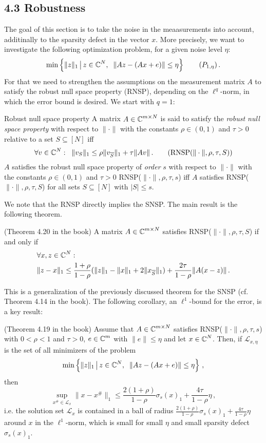 \documentclass[a4paper]{article}
\begin{document}
\subsection*{4.3  Robustness}
The goal of this section is to take the noise in the meaasurements into account, additinally to the sparsity defect in the vector \(x\).
More precisely, we want to investigate the following optimization problem, for a given noise level \(\eta\):
\[\min\left\{\|z\|_1\,\big|\,z\in \CC^N,\;\;\|Az-(Ax+e)\|\le \eta\right\}\tag{$P_{1,\eta}$}\,.\]
 For that we need to strengthen the assumptions on the measurement matrix \(A\) to satisfy the robust null space property (RNSP), depending on the \(\ell^q\)-norm, in which the error bound is desired. We start with \(q=1\):
\begin{Def*}
    {Robust null space property}{} A matrix \(A\in\operatorname{\mathbb C}^{m\times N}\) is said to satisfy the \emph{robust null space property} with respect to \(\|\cdot\|\) with the constants \(\rho\in (0,1)\) and \(\tau>0\) relative to a set \(S\subseteq[N]\) iff
    \[\forall v\in \operatorname{\mathbb C}^N:\;\; \|v_S\|_1\le \rho\|v_{\overline S}\|_1+\tau \|Av\|\,.\tag{RNSP($\|\cdot\|,\rho,\tau,S$)}\]
    \(A \) satisfies the robust null space property of \emph{order} \(s\) with respect to \(\|\cdot\|\) with the constants \(\rho\in (0,1)\) and \(\tau>0\) RNSP(\(\|\cdot\|,\rho,\tau, s\)) iff \(A \) satisfies RNSP(\(\|\cdot\|,\rho,\tau,S\)) for all sets \(S\subseteq[N]\) with \(|S|\le s\).
    \end{Def*}
    We note that the RNSP directly implies the SNSP. The main result is the following theorem.
    \begin{Satz*}
    {(Theorem 4.20 in the book)}{}
    A matrix \(A\in\operatorname{\mathbb C}^{m\times N}\) satisfies RNSP(\(\|\cdot\|,\rho,\tau,S\)) if and only if 
    \begin{align*}
    &\forall x,z\in \operatorname{\mathbb C}^N:\\ &\|z-x\|_1\le \frac{1+\rho}{1-\rho}(\|z\|_1-\|x\|_1+2\|x_{\overline S}\|_1)+\frac{2\tau}{1-\rho}\|A(x-z)\|\,.
    \end{align*}
    \end{Satz*}
    This is a generalization of the previously discussed theorem for the SNSP (cf. Theorem 4.14 in the book). The following corollary, an \(\ell^1\)-bound for the error, is a key result:
    \begin{Kor*}
        {(Theorem 4.19 in the book)}{}
        Assume that \(A\in\operatorname{\mathbb C}^{m\times N}\) satisfies RNSP(\(\|\cdot\|,\rho,\tau,s\)) with \(0<\rho<1\) and \(\tau>0\), \(e\in\operatorname{\mathbb C}^m\) with \(\|e\|\le \eta\) and let \(x\in \operatorname{\mathbb C}^N\). Then, if \(\mathcal L_{x,\eta}\) is the set of all minimizers of the problem
		\[\min\left\{\|z\|_1\,\big|\,z\in \operatorname{\mathbb C}^N,\;\;\|Az-(Ax+e)\|\le \eta\right\}\,,\]
    	then 
        \[\sup_{x^{\#}\in \mathcal L_x}\|x-x^{\#}\|_1\le \frac{2(1+\rho)}{1-\rho}\sigma_s(x)_1+\frac{4\tau}{1-\rho}\eta\,,\]
        i.e. the solution set \(\mathcal L_x\) is contained in a ball of radius \(\frac{2(1+\rho)}{1-\rho}\sigma_s(x)_1+\frac{4\tau}{1-\rho}\eta\) around \(x\) in the \(\ell^1\)-norm, which is small for small \(\eta\) and small sparsity defect \(\sigma_s(x)_1\).
    \end{Kor*}
\end{document}
